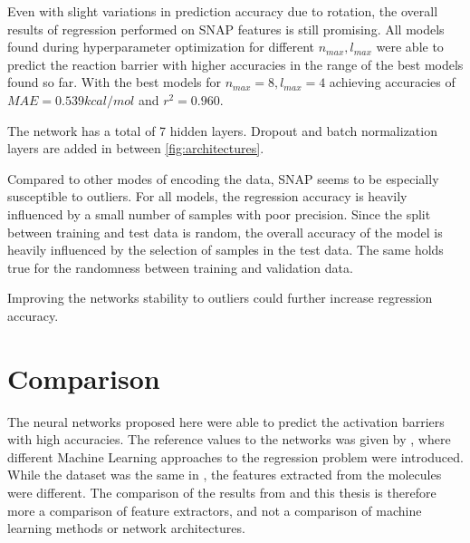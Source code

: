 Even with slight variations in prediction accuracy due to rotation, the overall results of regression performed on SNAP features is still promising.
All models found during hyperparameter optimization for different $n_{max}, l_{max}$ were able to predict the reaction barrier with higher accuracies in the
range of the best models found so far.
With the best models for $n_{max}=8, l_{max}=4$ achieving accuracies of $MAE=0.539 kcal/mol$ and $r^2=0.960$. %

The network has a total of 7 hidden layers.
Dropout and batch normalization layers are added in between \ref{fig:architectures}.

Compared to other modes of encoding the data, SNAP seems to be especially susceptible to outliers.
For all models, the regression accuracy is heavily influenced by a small number of samples with poor precision.
Since the split between training and test data is random, the overall accuracy of the model is 
heavily influenced by the selection of samples in the test data.
The same holds true for the randomness between training and validation data.

Improving the networks stability to outliers could further increase regression accuracy.


\section{Comparison}
\label{sec:Evaluation:Comparison}

The neural networks proposed here were able to predict the activation barriers with high accuracies.
The reference values to the networks was given by \cite{friederich_dos}, where different Machine Learning 
approaches to the regression problem were introduced.
While the dataset was the same in \cite{friederich_dos}, the features extracted from the molecules were different.
The comparison of the results from  and this thesis is therefore more 
a comparison of feature extractors, and not a comparison of machine learning methods or network architectures.

